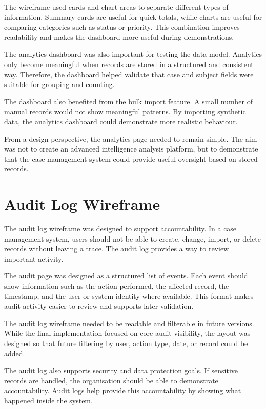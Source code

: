 The wireframe used cards and chart areas to separate different types of information. Summary cards are useful for quick totals, while charts are useful for comparing categories such as status or priority. This combination improves readability and makes the dashboard more useful during demonstrations.

The analytics dashboard was also important for testing the data model. Analytics only become meaningful when records are stored in a structured and consistent way. Therefore, the dashboard helped validate that case and subject fields were suitable for grouping and counting.

The dashboard also benefited from the bulk import feature. A small number of manual records would not show meaningful patterns. By importing synthetic data, the analytics dashboard could demonstrate more realistic behaviour.

From a design perspective, the analytics page needed to remain simple. The aim was not to create an advanced intelligence analysis platform, but to demonstrate that the case management system could provide useful oversight based on stored records.


\section{Audit Log Wireframe}

The audit log wireframe was designed to support accountability. In a case management system, users should not be able to create, change, import, or delete records without leaving a trace. The audit log provides a way to review important activity.

The audit page was designed as a structured list of events. Each event should show information such as the action performed, the affected record, the timestamp, and the user or system identity where available. This format makes audit activity easier to review and supports later validation.

The audit log wireframe needed to be readable and filterable in future versions. While the final implementation focused on core audit visibility, the layout was designed so that future filtering by user, action type, date, or record could be added.

The audit log also supports security and data protection goals. If sensitive records are handled, the organisation should be able to demonstrate accountability. Audit logs help provide this accountability by showing what happened inside the system.

